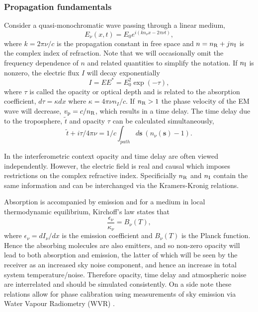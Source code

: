 \subsubsection{Propagation fundamentals}\label{sec:prop_fund}
Consider a quasi-monochromatic wave passing through a linear medium,
\begin{equation}
E_\nu(x,t) = E_0 e^{i(kn_\nu x - 2\pi\nu t)},
\end{equation}		
where $k=2\pi \nu/c$ is the propagation constant in free space and $n= n_{\rm R} + j n_{\rm I}$ is the complex index of refraction. Note that we will occasionally omit the frequency dependence of $n$ and related quantities to simplify the notation. If $n_{\rm I}$ is nonzero, the electric flux $I$ will decay exponentially
\begin{equation}
I = EE^\ast = E_0^2 \exp(-\tau),
\end{equation}
where $\tau$ is called the opacity or optical depth and is related to the absorption coefficient, $d\tau = \kappa dx$ where $\kappa = 4\pi \nu n_I/c$. If $n_{\rm R} > 1 $ the phase velocity of the EM wave will decrease, $v_{\rm p} = c/n_{\rm R}$, which results in a time delay. The time delay due to the troposphere, $\tilde{t}$ and opacity $\tau$ can be calculated simultaneously,
\begin{equation}\label{timedelay}
\tilde{t} + i \tau /4\pi \nu =1/c \int_{path} d\bm{s}\  (n_\nu(\bm{s}) -1).
\end{equation}

In the interferometric context opacity and time delay are often viewed independently. However, the electric field is real and causal which imposes restrictions on the complex refractive index. Specificially $n_{\rm R}$ and $n_{\rm I}$ contain the same information and can be interchanged via the Kramers-Kronig relations. 

Absorption is accompanied by emission and for a medium in local thermodynamic equilibrium, Kirchoff's law states that 
\begin{equation}\label{kirchoff}
\frac{\epsilon_\nu}{\kappa_\nu}=B_\nu(T),
\end{equation}
where $\epsilon_\nu = dI_\nu/dx$ is the emission coefficient and $B_\nu(T)$ is the Planck function. Hence the absorbing molecules are also emitters, and so non-zero opacity will lead to both absorption and emission, the latter of which will be seen by the receiver as an increased sky noise component, and hence an increase in total system temperature/noise. Therefore opacity, time delay and atmospheric noise are interrelated and should be simulated consistently. On a side note these relations allow for phase calibration using measurements of sky emission via Water Vapour Radiometry (WVR) \citep*[e.g.][]{Carilli_1999}.

